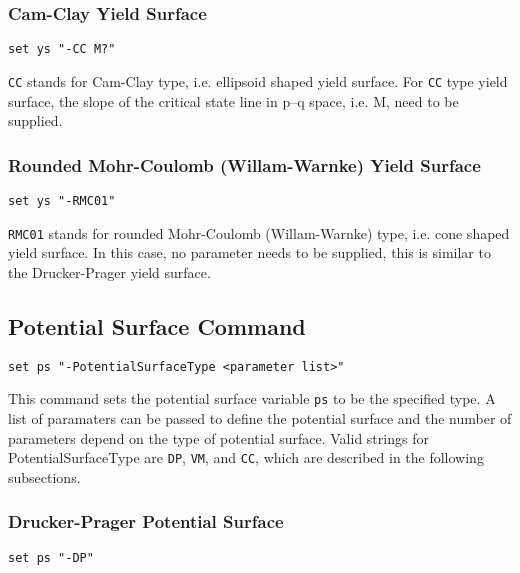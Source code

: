\subsubsection{Cam-Clay Yield Surface} 
\label{cc_ys}
\begin{verbatim}
set ys "-CC M?"
\end{verbatim}

\texttt{CC}  stands  for  Cam-Clay  type, i.e. ellipsoid shaped
yield surface. For \texttt{CC} type yield surface, the slope of
the  critical  state  line  in  p--q  space, i.e. M, need to be
supplied.

\subsubsection{Rounded Mohr-Coulomb (Willam-Warnke) Yield Surface} 
\label{rmc01_ys}
\begin{verbatim}
set ys "-RMC01"
\end{verbatim}

\texttt{RMC01} stands for rounded Mohr-Coulomb (Willam-Warnke) type, 
i.e. cone shaped
yield  surface. In this case, no parameter needs to be supplied, 
this is similar to the Drucker-Prager yield surface.

\subsection{Potential Surface Command}
\label{PS_Command}

\begin{verbatim}
set ps "-PotentialSurfaceType <parameter list>"
\end{verbatim}

This command sets the potential surface variable \texttt{ps} to
be  the  specified  type. A list of paramaters can be passed to
define  the  potential  surface  and  the  number of parameters
depend  on  the  type  of  potential surface. Valid strings for
PotentialSurfaceType    are   \texttt{DP},   \texttt{VM},   and
\texttt{CC}, which are described in the following subsections.

\subsubsection{Drucker-Prager Potential Surface} 
\label{dp_ps}
\begin{verbatim}
set ps "-DP"
\end{verbatim}

